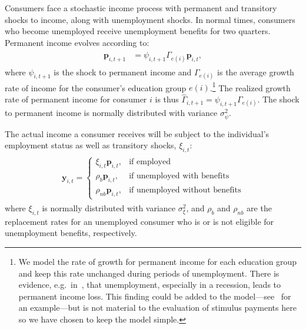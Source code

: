 \documentclass[qe]{econsocart}
\begin{document}
Consumers face a stochastic income process with permanent and transitory shocks to income, along with unemployment shocks.
In normal times, consumers who become unemployed receive unemployment benefits for two quarters.
Permanent income evolves according to:
\begin{equation}
  \begin{gathered}
    \begin{aligned}
      \mathbf{p}_{i,t+1} & = \psi_{i,t+1}\Gamma_{e(i)}\mathbf{p}_{i,t},
    \end{aligned}
  \end{gathered}
\end{equation}
where $\psi_{i,t+1}$ is the shock to permanent income and $\Gamma_{e(i)}$ is the average growth rate of income for the consumer's education group $e(i)$.\footnote{We model the rate of growth for permanent income for each education group and keep this rate unchanged during periods of unemployment.
  There is evidence, e.g.\ in~\cite{davis-recessions-2011}, that unemployment, especially in a recession, leads to permanent income loss.
  This finding could be added to the model---see~\cite{carroll2020modeling} for an example---but is not material to the evaluation of stimulus payments here so we have chosen to keep the model simple.
} The realized growth rate of permanent income for consumer $i$ is thus $\hat{\Gamma}_{i,t+1} = \psi_{i,t+1} \Gamma_{e(i)}$.
The shock to permanent income is normally distributed with variance $\sigma_{\psi}^2$.

The actual income a consumer receives will be subject to the individual's employment status as well as transitory shocks, $\xi_{i,t}$:
\begin{equation}
  \begin{gathered}
    \begin{aligned}
      \mathbf{y}_{i,t} =   \begin{cases}
                             \xi_{i,t}\mathbf{p}_{i,t},  & \text{if employed}                    \\
                             \rho_b \mathbf{p}_{i,t},    & \text{if unemployed with benefits}    \\
                             \rho_{nb} \mathbf{p}_{i,t}, & \text{if unemployed without benefits}
                           \end{cases}
    \end{aligned}
  \end{gathered}
\end{equation}
where $\xi_{i,t}$ is normally distributed with variance $\sigma_{\xi}^2$, and $\rho_b$ and $\rho_{nb}$ are the replacement rates for an unemployed consumer who is or is not eligible for unemployment benefits, respectively.
\end{document}
